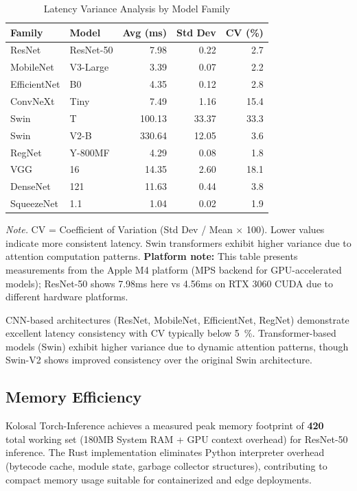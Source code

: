\documentclass[10pt,twocolumn,a4paper]{article}
\theoremstyle{definition}
\theoremstyle{plain}
\begin{document}
\begin{table}[t]
\centering
\caption{Latency Variance Analysis by Model Family}
\label{tab:latency_variance}
\footnotesize
\setlength{\tabcolsep}{4pt}
\begin{tabular}{@{}llrrr@{}}
\toprule
\textbf{Family} & \textbf{Model} & \textbf{Avg (ms)} & \textbf{Std Dev} & \textbf{CV (\%)} \\
\midrule
ResNet & ResNet-50 & 7.98 & 0.22 & 2.7 \\
MobileNet & V3-Large & 3.39 & 0.07 & 2.2 \\
EfficientNet & B0 & 4.35 & 0.12 & 2.8 \\
ConvNeXt & Tiny & 7.49 & 1.16 & 15.4 \\
Swin & T & 100.13 & 33.37 & 33.3 \\
Swin & V2-B & 330.64 & 12.05 & 3.6 \\
RegNet & Y-800MF & 4.29 & 0.08 & 1.8 \\
VGG & 16 & 14.35 & 2.60 & 18.1 \\
DenseNet & 121 & 11.63 & 0.44 & 3.8 \\
SqueezeNet & 1.1 & 1.04 & 0.02 & 1.9 \\
\bottomrule
\end{tabular}

\vspace{0.5em}
\noindent\textit{Note.} CV = Coefficient of Variation (Std Dev / Mean $\times$ 100). Lower values indicate more consistent latency. Swin transformers exhibit higher variance due to attention computation patterns. \textbf{Platform note:} This table presents measurements from the Apple M4 platform (MPS backend for GPU-accelerated models); ResNet-50 shows 7.98ms here vs 4.56ms on RTX 3060 CUDA due to different hardware platforms.
\end{table}

CNN-based architectures (ResNet, MobileNet, EfficientNet, RegNet) demonstrate excellent latency consistency with CV typically below \SI{5}{\percent}. Transformer-based models (Swin) exhibit higher variance due to dynamic attention patterns, though Swin-V2 shows improved consistency over the original Swin architecture.

\subsection{Memory Efficiency}

Kolosal Torch-Inference achieves a measured peak memory footprint of \textbf{\SI{420}{\mega\byte}} total working set (180MB System RAM + GPU context overhead) for ResNet-50 inference. The Rust implementation eliminates Python interpreter overhead (bytecode cache, module state, garbage collector structures), contributing to compact memory usage suitable for containerized and edge deployments.
\end{document}
